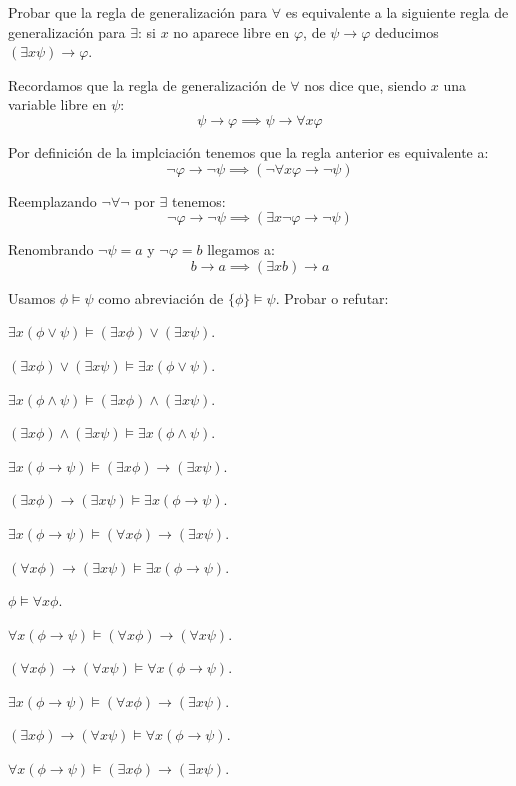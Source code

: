 \begin{problem} Probar que la regla de generalizaci\'on para  $\forall$ es equivalente a la siguiente regla de generalizaci\'on para
$\exists$: si $x$ no aparece libre en $\varphi$, de $\psi \to \varphi$ deducimos $(\exists x \psi) \to \varphi$.

\solution
{}

Recordamos que la regla de generalización de $\forall$ nos dice que, siendo $x$ una variable libre en $\psi$:
\[\psi \to \varphi \implies \psi \to \forall x \varphi\]

Por definición de la implciación tenemos que la regla anterior es equivalente a:
\[\neg \varphi \to \neg \psi \implies (\neg \forall x \varphi \to \neg \psi)\]

Reemplazando $\neg \forall \neg$ por $\exists$ tenemos:
\[\neg \varphi \to \neg \psi  \implies (\exists x \neg \varphi \to \neg \psi)\]

Renombrando $\neg \psi =a $ y $\neg \varphi =b$ llegamos a:
\[b \to a \implies (\exists x b) \to a \]

\end{problem}

\begin{problem} Usamos $\phi \models \psi$ como abreviaci\'on de  $\{\phi\} \models \psi$.  Probar o refutar:

\ppart $\exists x (\phi \vee \psi) \models (\exists x  \phi )\vee  (\exists x \psi)$.

\ppart  $(\exists x  \phi )\vee  (\exists x \psi) \models  \exists x (\phi \vee \psi) $.

\ppart $\exists x (\phi \wedge \psi) \models (\exists x  \phi )\wedge  (\exists x \psi)$.

\ppart  $(\exists x  \phi ) \wedge  (\exists x \psi) \models  \exists x (\phi  \wedge \psi) $.

\ppart $\exists x (\phi \to \psi) \models (\exists x  \phi )\to  (\exists x \psi)$.

\ppart  $(\exists x  \phi )\to  (\exists x \psi) \models  \exists x (\phi \to \psi) $.

\ppart $\exists x (\phi \to \psi) \models (\forall x  \phi ) \to  (\exists x \psi)$.

\ppart  $(\forall x  \phi ) \to  (\exists x \psi) \models  \exists x (\phi  \to \psi) $.


\ppart  $ \phi  \models  \forall x \phi$.

\ppart $\forall x (\phi \to \psi) \models (\forall x  \phi )\to  (\forall x \psi)$.

\ppart  $(\forall x  \phi )\to  (\forall x \psi) \models  \forall x (\phi \to \psi) $.

\ppart $\exists x (\phi \to \psi) \models (\forall x  \phi ) \to  (\exists x \psi)$.

\ppart  $(\exists x  \phi ) \to  (\forall x \psi) \models  \forall x (\phi  \to \psi) $.

\ppart $\forall x (\phi \to \psi) \models (\exists x  \phi )\to  (\exists x \psi)$.



\solution
\end{problem}

